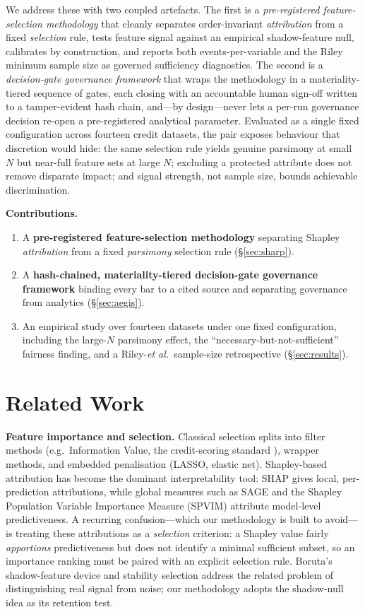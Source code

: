 \documentclass[9pt,journal]{IEEEtai}
\begin{document}
We address these with two coupled artefacts. The first is a \emph{pre-registered
feature-selection methodology} that cleanly separates order-invariant \emph{attribution} from a
fixed \emph{selection} rule, tests feature signal against an empirical shadow-feature null,
calibrates by construction, and reports both events-per-variable and the Riley minimum sample
size as governed sufficiency diagnostics. The second is a \emph{decision-gate governance
framework} that wraps the methodology in a materiality-tiered sequence of gates, each closing
with an accountable human sign-off written to a tamper-evident hash chain, and---by design---never
lets a per-run governance decision re-open a pre-registered analytical parameter.
Evaluated as a single fixed configuration across fourteen credit datasets, the pair exposes
behaviour that discretion would hide: the same selection rule yields genuine parsimony at small
$N$ but near-full feature sets at large $N$; excluding a protected attribute does not remove
disparate impact; and signal strength, not sample size, bounds achievable discrimination.

\textbf{Contributions.}
\begin{enumerate}
\item A \textbf{pre-registered feature-selection methodology} separating Shapley
\emph{attribution} from a fixed \emph{parsimony} selection rule (\S\ref{sec:sharp}).
\item A \textbf{hash-chained, materiality-tiered decision-gate governance framework} binding
every bar to a cited source and separating governance from analytics (\S\ref{sec:aegis}).
\item An empirical study over fourteen datasets under one fixed configuration, including the
large-$N$ parsimony effect, the ``necessary-but-not-sufficient'' fairness finding, and a
Riley-\emph{et al.}\ sample-size retrospective (\S\ref{sec:results}).
\end{enumerate}

\section{Related Work}\label{sec:related}
\textbf{Feature importance and selection.} Classical selection splits into filter methods
(e.g.\ Information Value, the credit-scoring standard \cite{siddiqi2006}), wrapper methods, and
embedded penalisation (LASSO, elastic net). Shapley-based attribution has become the dominant
interpretability tool: SHAP \cite{lundberg2017shap} gives local, per-prediction attributions,
while global measures such as SAGE \cite{covert2020sage} and the Shapley Population Variable
Importance Measure (SPVIM) \cite{williamson2020spvim} attribute model-level predictiveness. A
recurring confusion---which our methodology is built to avoid---is treating these attributions as a
\emph{selection} criterion: a Shapley value fairly \emph{apportions} predictiveness but does not
identify a minimal sufficient subset, so an importance ranking must be paired with an explicit
selection rule. Boruta's shadow-feature device \cite{kursa2010boruta} and stability selection
\cite{meinshausen2010stability} address the related problem of distinguishing real signal from
noise; our methodology adopts the shadow-null idea as its retention test.
\end{document}

